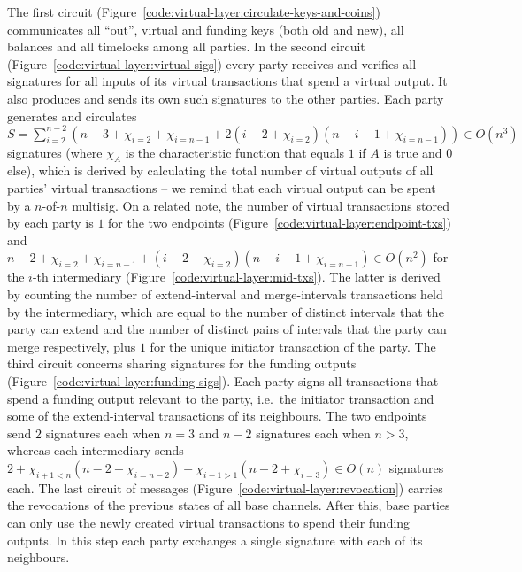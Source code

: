   The first circuit (Figure~\ref{code:virtual-layer:circulate-keys-and-coins})
  communicates all ``out'', virtual and funding keys (both old and new), all
  balances and all timelocks among all parties. In the second circuit
  (Figure~\ref{code:virtual-layer:virtual-sigs}) every party receives and
  verifies all signatures for all inputs of its virtual transactions that spend
  a virtual output. It also produces and sends its own such signatures to the
  other parties. Each party generates and circulates $S = \sum\limits_{i =
  2}^{n-2} (n-3 + \chi_{i = 2} + \chi_{i = n - 1} + 2(i - 2 + \chi_{i = 2})(n -
  i - 1 + \chi_{i = n - 1})) \in O(n^3)$ signatures (where $\chi_A$ is the
  characteristic function that equals $1$ if $A$ is true and $0$ else), which is
  derived by calculating the total number of virtual outputs of all parties'
  virtual transactions -- we remind that each virtual output can be spent by a
  $n$-of-$n$ multisig.
On a related note, the
  number of virtual transactions stored by each party is $1$ for the two
  endpoints (Figure~\ref{code:virtual-layer:endpoint-txs}) and $n - 2 + \chi_{i
  = 2} + \chi_{i = n - 1} +  (i - 2 + \chi_{i = 2}) (n - i - 1 + \chi_{i = n-1})
  \in O(n^2)$ for the $i$-th intermediary
  (Figure~\ref{code:virtual-layer:mid-txs}). The latter is derived by counting
  the number of extend-interval and merge-intervals transactions held by the
  intermediary, which are equal to the number of distinct intervals that the
  party can extend and the number of distinct pairs of intervals that the party
  can merge respectively, plus $1$ for the unique initiator transaction of the
  party.
  The third circuit concerns sharing signatures for the funding outputs
  (Figure~\ref{code:virtual-layer:funding-sigs}). Each party signs all
  transactions that spend a funding output relevant to the party, i.e.\ the
  initiator transaction and some of the extend-interval transactions of its
  neighbours. The two endpoints send $2$ signatures each when $n = 3$ and $n -
  2$ signatures each when $n > 3$, whereas each intermediary sends $2 + \chi_{i
  + 1 < n}(n - 2 + \chi_{i = n - 2}) + \chi_{i - 1 > 1}(n - 2 + \chi_{i = 3})
  \in O(n)$ signatures each. The last circuit of messages
  (Figure~\ref{code:virtual-layer:revocation}) carries the revocations of the
  previous states of all base channels. After this, base parties can only use
  the newly created virtual transactions to spend their funding outputs. In this
  step each party exchanges a single signature with each of its neighbours.

